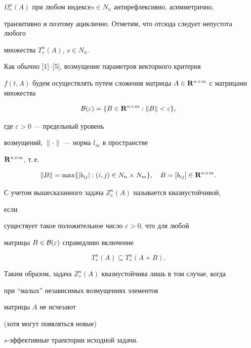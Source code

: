 $\Omega^n_s(A)$ при любом индексе\linebreak $s\in N_n$ антирефлексивно, асимметрично,


транзитивно и поэтому ациклично. Отметим, что отсюда следует непустота любого


множества $T^n_s(A)$, $s\in N_n$.





Как обычно [1]--[5], возмущение параметров векторного критерия


$f(t,A)$ будем осуществлять путем сложения матрицы $A\in


\bold{R}^{n\times m}$ с матрицами множества


$$


{\cal B}(\varepsilon)=\{B\in \bold{R}^{n\times m} :


\|B\|< \varepsilon\},


$$


где $\varepsilon >0$ --- предельный уровень


возмущений, $\|\cdot\|$ --- норма $l_{\infty}$ в пространстве


$\bold{R}^{n\times m}$, т.\,е.


$$


\|B\|=\max \{|b_{ij}| : (i,j)\in N_n\times N_m\},\quad


B=[b_{ij}]\in \bold{R}^{n\times m}.


$$





С учетом вышесказанного задача $Z^n_s(A)$ называется квазиустойчивой,


если


существует такое положительное число $\varepsilon>0$, что для любой


матрицы $B\in {\cal B}(\varepsilon)$ справедливо включение


$$


T^n_s(A) \subseteq T^n_s(A+B).


$$


Таким образом, задача $Z^n_s(A)$ квазиустойчива лишь в том случае, когда


при ``малых'' независимых возмущениях элементов


матрицы $A$ не исчезают


(хотя могут появляться новые)\linebreak


$s$-эффективные траектории исходной задачи.





